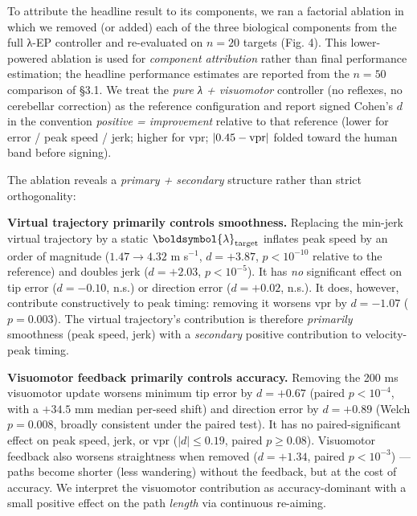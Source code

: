 \documentclass[
  11pt,
]{article}
\begin{document}
To attribute the headline result to its components, we ran a factorial
ablation in which we removed (or added) each of the three biological
components from the full λ-EP controller and re-evaluated on \(n = 20\)
targets (Fig. 4). This lower-powered ablation is used for
\emph{component attribution} rather than final performance estimation;
the headline performance estimates are reported from the \(n = 50\)
comparison of §3.1. We treat the \emph{pure λ + visuomotor} controller
(no reflexes, no cerebellar correction) as the reference configuration
and report signed Cohen's \(d\) in the convention \emph{positive =
improvement} relative to that reference (lower for error / peak speed /
jerk; higher for vpr; \(|0.45 - {\rm vpr}|\) folded toward the human
band before signing).

The ablation reveals a \emph{primary + secondary} structure rather than
strict orthogonality:

\textbf{Virtual trajectory primarily controls smoothness.} Replacing the
min-jerk virtual trajectory by a static
\(\boldsymbol{\lambda}_{\rm target}\) inflates peak speed by an order of
magnitude (\(1.47 \to 4.32\) m s\(^{-1}\), \(d = +3.87\),
\(p < 10^{-10}\) relative to the reference) and doubles jerk
(\(d = +2.03\), \(p < 10^{-5}\)). It has \emph{no} significant effect on
tip error (\(d = -0.10\), n.s.) or direction error (\(d = +0.02\),
n.s.). It does, however, contribute constructively to peak timing:
removing it worsens vpr by \(d = -1.07\) (\(p = 0.003\)). The virtual
trajectory's contribution is therefore \emph{primarily} smoothness (peak
speed, jerk) with a \emph{secondary} positive contribution to
velocity-peak timing.

\textbf{Visuomotor feedback primarily controls accuracy.} Removing the
200 ms visuomotor update worsens minimum tip error by \(d = +0.67\)
(paired \(p < 10^{-4}\), with a \(+34.5\) mm median per-seed shift) and
direction error by \(d = +0.89\) (Welch \(p = 0.008\), broadly
consistent under the paired test). It has no paired-significant effect
on peak speed, jerk, or vpr (\(|d| \le 0.19\), paired \(p \ge 0.08\)).
Visuomotor feedback also worsens straightness when removed
(\(d = +1.34\), paired \(p < 10^{-3}\)) --- paths become shorter (less
wandering) without the feedback, but at the cost of accuracy. We
interpret the visuomotor contribution as accuracy-dominant with a small
positive effect on the path \emph{length} via continuous re-aiming.
\end{document}
